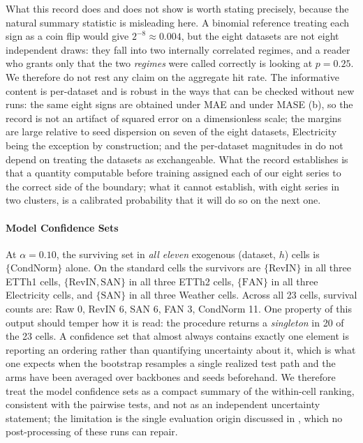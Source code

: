 What this record does and does not show is worth stating precisely, because the natural summary statistic is misleading here. A binomial reference treating each sign as a coin flip would give $2^{-8}\approx 0.004$, but the eight datasets are not eight independent draws: they fall into two internally correlated regimes, and a reader who grants only that the two \emph{regimes} were called correctly is looking at $p = 0.25$. We therefore do not rest any claim on the aggregate hit rate. The informative content is per-dataset and is robust in the ways that can be checked without new runs: the same eight signs are obtained under MAE and under MASE (b), so the record is not an artifact of squared error on a dimensionless scale; the margins are large relative to seed dispersion on seven of the eight datasets, Electricity being the exception by construction; and the per-dataset magnitudes in  do not depend on treating the datasets as exchangeable. What the record establishes is that a quantity computable before training assigned each of our eight series to the correct side of the boundary; what it cannot establish, with eight series in two clusters, is a calibrated probability that it will do so on the next one.

\paragraph{Model Confidence Sets} At $\alpha=0.10$, the surviving set in \emph{all eleven} exogenous (dataset, $h$) cells is $\{\text{CondNorm}\}$ alone. On the standard cells the survivors are $\{\text{RevIN}\}$ in all three ETTh1 cells, $\{\text{RevIN},\text{SAN}\}$ in all three ETTh2 cells, $\{\text{FAN}\}$ in all three Electricity cells, and $\{\text{SAN}\}$ in all three Weather cells. Across all 23 cells, survival counts are: Raw 0, RevIN 6, SAN 6, FAN 3, CondNorm 11. One property of this output should temper how it is read: the procedure returns a \emph{singleton} in 20 of the 23 cells. A confidence set that almost always contains exactly one element is reporting an ordering rather than quantifying uncertainty about it, which is what one expects when the bootstrap resamples a single realized test path and the arms have been averaged over backbones and seeds beforehand. We therefore treat the model confidence sets as a compact summary of the within-cell ranking, consistent with the pairwise tests, and not as an independent uncertainty statement; the limitation is the single evaluation origin discussed in , which no post-processing of these runs can repair.

